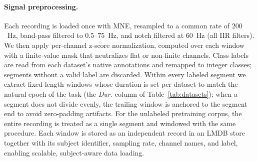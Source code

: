 \documentclass{article}
\begin{document}
\paragraph{Signal preprocessing.}
Each recording is loaded once with MNE, resampled to a common rate of $200$~Hz, band-pass filtered to $0.5$--$75$~Hz, and notch filtered at $60$~Hz (all IIR filters).
We then apply per-channel z-score normalization, computed over each window with a finite-value mask that neutralizes flat or non-finite channels.
Class labels are read from each dataset's native annotations and remapped to integer classes; segments without a valid label are discarded.
Within every labeled segment we extract fixed-length windows whose duration is set per dataset to match the natural epoch of the task (the \emph{Dur.} column of Table~\ref{tab:datasets}); when a segment does not divide evenly, the trailing window is anchored to the segment end to avoid zero-padding artifacts.
For the unlabeled pretraining corpus, the entire recording is treated as a single segment and windowed with the same procedure.
Each window is stored as an independent record in an LMDB store together with its subject identifier, sampling rate, channel names, and label, enabling scalable, subject-aware data loading.
\end{document}
